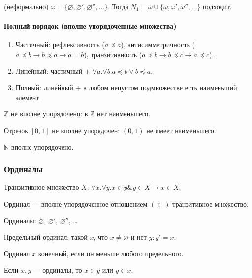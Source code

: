 (неформально) $\omega = \{\varnothing, \varnothing', \varnothing'', \dots\}$.
Тогда $N_1 = \omega\cup\{\omega,\omega',\omega'',\dots\}$ подходит.


\paragraph{Полный порядок (вполне упорядоченные множества)}
\begin{enumerate}
\item Частичный: рефлексивность ($a \preceq a$), антисимметричность ($a \preceq b \rightarrow b \preceq a\rightarrow a=b$),
транзитивность ($a \preceq b \rightarrow b \preceq c \rightarrow a \preceq c$).
\item Линейный: частичный + $\forall a.\forall b.a \preceq b \vee b \preceq a$.
\item Полный: линейный + в любом непустом подмножестве есть наименьший элемент.
\end{enumerate}

\begin{example} $\mathbb{Z}$ не вполне упорядочено: в $\mathbb{Z}$ нет наименьшего. \end{example}
\begin{example} Отрезок $[0,1]$ не вполне упорядочен: $(0,1)$ не имеет наименьшего. \end{example}
\begin{example} $\mathbb{N}$ вполне упорядочено. \end{example}


\subsubsection{Ординалы}
\begin{definition}
   Транзитивное множество $X$: $\forall x.\forall y.x \in y \& y \in X \rightarrow x \in X$.
\end{definition}
\begin{definition}
   Ординал --- вполне упорядоченное отношением $(\in)$ транзитивное множество.
\end{definition}
\begin{example} Ординалы: $\varnothing$,  $\varnothing'$,  $\varnothing''$, \dots \end{example}

\begin{definition}
   Предельный ординал: такой $x$, что $x \ne \varnothing$ и нет $y: y' = x$.
\end{definition}
\begin{definition}
   Ординал $x$ конечный, если он меньше любого предельного.
\end{definition}
\begin{theorem}
   Если $x,y$ --- ординалы, то $x\in y$ или $y \in x$.
\end{theorem}

